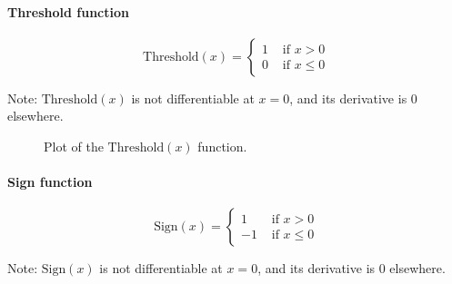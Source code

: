 \documentclass{article}
\begin{document}
        \paragraph{Threshold function}\label{eqthreshold}

          \begin{equation*}
            \text{Threshold} (x) =
              \begin{cases}
                1 & \text{ if } x > 0 \\
                0 & \text{ if } x \leq 0
              \end{cases}
          \end{equation*}

          Note: $\text{Threshold}(x)$ is not differentiable at $x=0$, and its
          derivative is $0$ elsewhere.

          \begin{figure}[!htb]
            \centering
            \caption{%
              Plot of the $\text{Threshold}(x)$ function.
            }
          \end{figure}

        \paragraph{Sign function}

          \begin{equation*}
            \text{Sign} (x) =
              \begin{cases}
                1 & \text{ if } x > 0 \\
                -1 & \text{ if } x \leq 0
              \end{cases}
          \end{equation*}

          Note: $\text{Sign}(x)$ is not differentiable at $x=0$, and its
          derivative is $0$ elsewhere.
\end{document}
